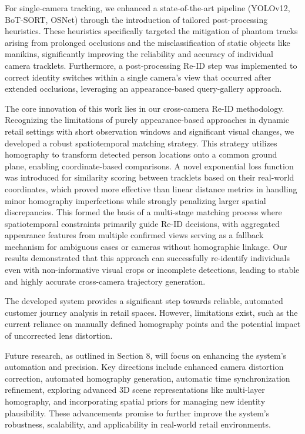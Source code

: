 \documentclass[12pt, a4paper]{article}
\begin{document}
For single-camera tracking, we enhanced a state-of-the-art pipeline (YOLOv12, BoT-SORT, OSNet) through the introduction of tailored post-processing heuristics. These heuristics specifically targeted the mitigation of phantom tracks arising from prolonged occlusions and the misclassification of static objects like manikins, significantly improving the reliability and accuracy of individual camera tracklets. Furthermore, a post-processing Re-ID step was implemented to correct identity switches within a single camera's view that occurred after extended occlusions, leveraging an appearance-based query-gallery approach.

The core innovation of this work lies in our cross-camera Re-ID methodology. Recognizing the limitations of purely appearance-based approaches in dynamic retail settings with short observation windows and significant visual changes, we developed a robust spatiotemporal matching strategy. This strategy utilizes homography to transform detected person locations onto a common ground plane, enabling coordinate-based comparisons. A novel exponential loss function was introduced for similarity scoring between tracklets based on their real-world coordinates, which proved more effective than linear distance metrics in handling minor homography imperfections while strongly penalizing larger spatial discrepancies. This formed the basis of a multi-stage matching process where spatiotemporal constraints primarily guide Re-ID decisions, with aggregated appearance features from multiple confirmed views serving as a fallback mechanism for ambiguous cases or cameras without homographic linkage. Our results demonstrated that this approach can successfully re-identify individuals even with non-informative visual crops or incomplete detections, leading to stable and highly accurate cross-camera trajectory generation.

The developed system provides a significant step towards reliable, automated customer journey analysis in retail spaces. However, limitations exist, such as the current reliance on manually defined homography points and the potential impact of uncorrected lens distortion.

Future research, as outlined in Section 8, will focus on enhancing the system's automation and precision. Key directions include enhanced camera distortion correction, automated homography generation, automatic time synchronization refinement, exploring advanced 3D scene representations like multi-layer homography, and incorporating spatial priors for managing new identity plausibility. These advancements promise to further improve the system's robustness, scalability, and applicability in real-world retail environments.
\end{document}
